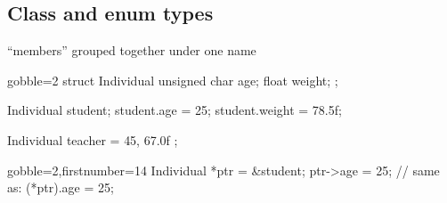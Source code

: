 \subsection[Class/Enum]{Class and enum types}

\begin{frame}[fragile]
  \begin{mdframed}[style=simplebox]
    \center ``members'' grouped together under one name
  \end{mdframed}
  \begin{multicols}{2}
    \begin{cppcode*}{gobble=2}
      struct Individual {
        unsigned char age;
        float weight;
      };

      Individual student;
      student.age = 25;
      student.weight = 78.5f;

      Individual teacher = {
        45, 67.0f
      };
    \end{cppcode*}
    \columnbreak
    \begin{cppcode*}{gobble=2,firstnumber=14}
      Individual *ptr = &student;
      ptr->age = 25;
      // same as: (*ptr).age = 25;
    \end{cppcode*}
    \pause
    \vfill
    \hspace{-1.5cm}
    \vfill \null
  \end{multicols}
\end{frame}

